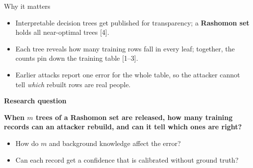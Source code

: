 \documentclass{article}
\newcommand{\bodysize}{\fontsize{18}{23}\selectfont}
\newcommand{\headsize}{\fontsize{28}{34}\selectfont}
\newlength{\colw}
\newcommand{\rowgap}{\par\vspace{3mm}}
\begin{document}
\begin{minipage}[t]{\colw}\vspace{0pt}
\begin{pbox}{Why it matters}
\begin{itemize}
\item Interpretable decision trees get published for transparency; a
  \textbf{Rashomon set} holds all near-optimal trees [4].
\item Each tree reveals how many training rows fall in every leaf; together,
  the counts pin down the training table [1--3].
\item Earlier attacks report one error for the whole table, so the attacker
  cannot tell \emph{which} rebuilt rows are real people.
\end{itemize}
\end{pbox}
\end{minipage}\hfill
\begin{minipage}[t]{\colw}\vspace{0pt}
\vspace{3mm}
\begin{tcolorbox}[enhanced,colback=wash,colframe=wash,arc=2mm,boxrule=0pt,
  left=5mm,right=5mm,top=4mm,bottom=4mm,fontupper=\bodysize\RaggedRight,before skip=0mm,after skip=0mm]
{\headsize\bfseries\color{accent} Research question\par}\vspace{2mm}
{\fontsize{21}{27}\selectfont\bfseries When $m$ trees of a Rashomon set are
released, how many training records can an attacker rebuild, and can it
tell which ones are right?\par}
\vspace{2mm}
\begin{itemize}
\item[\textbf{1}] How do $m$ and background knowledge affect the error?
\item[\textbf{2}] Can each record get a confidence that is calibrated
  without ground truth?
\end{itemize}
\end{tcolorbox}
\end{minipage}
\rowgap
\end{document}
